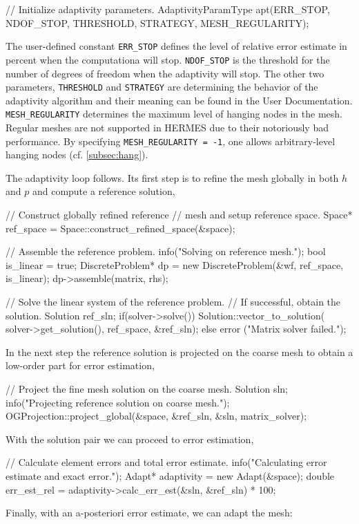 \documentclass[final,3p,times,twocolumn]{elsarticle}
\begin{document}
\begin{code}
  // Initialize adaptivity parameters.
  AdaptivityParamType apt(ERR_STOP, NDOF_STOP, 
                          THRESHOLD, STRATEGY, 
                          MESH_REGULARITY);
\end{code}
The user-defined constant {\tt ERR\_STOP} defines the level of 
relative error estimate in percent when the computationa will stop. 
{\tt NDOF\_STOP} is the threshold for the number of degrees of freedom 
when the adaptivity will stop. The other two parameters, {\tt THRESHOLD}
and {\tt STRATEGY} are determining the behavior of the adaptivity 
algorithm and their meaning can be found in the User Documentation.
{\tt MESH\_REGULARITY} determines the maximum level of hanging nodes
in the mesh. Regular meshes are not supported in HERMES due to their 
notoriously bad performance. By specifying {\tt MESH\_REGULARITY = -1},
one allows arbitrary-level hanging nodes (cf. \ref{subsec:hang}).

The adaptivity loop follows. Its first step is to 
refine the mesh globally in both $h$ and $p$ and 
compute a reference solution,

\begin{code}
  // Construct globally refined reference 
  // mesh and setup reference space.
  Space* ref_space 
    = Space::construct_refined_space(&space);

  // Assemble the reference problem.
  info("Solving on reference mesh.");
  bool is_linear = true;
  DiscreteProblem* dp 
    = new DiscreteProblem(&wf, ref_space, is_linear);
  dp->assemble(matrix, rhs);

  // Solve the linear system of the reference problem.
  //  If successful, obtain the solution.
  Solution ref_sln;
  if(solver->solve()) Solution::vector_to_solution(
    solver->get_solution(), ref_space, &ref_sln);
  else error ("Matrix solver failed.\n");
\end{code}
In the next step the reference solution is projected on
the coarse mesh to obtain a low-order part
for error estimation,

\begin{code}
  // Project the fine mesh solution on the coarse mesh.
  Solution sln;
  info("Projecting reference solution on coarse mesh.");
  OGProjection::project_global(&space, 
    &ref_sln, &sln, matrix_solver);
\end{code}
With the solution pair we can proceed to error 
estimation,

\begin{code}
  // Calculate element errors and total error estimate.
  info("Calculating error estimate and exact error.");
  Adapt* adaptivity = new Adapt(&space);
  double err_est_rel 
    = adaptivity->calc_err_est(&sln, &ref_sln) * 100;
\end{code}
Finally, with an a-posteriori error estimate, we can 
adapt the mesh:
\end{document}
